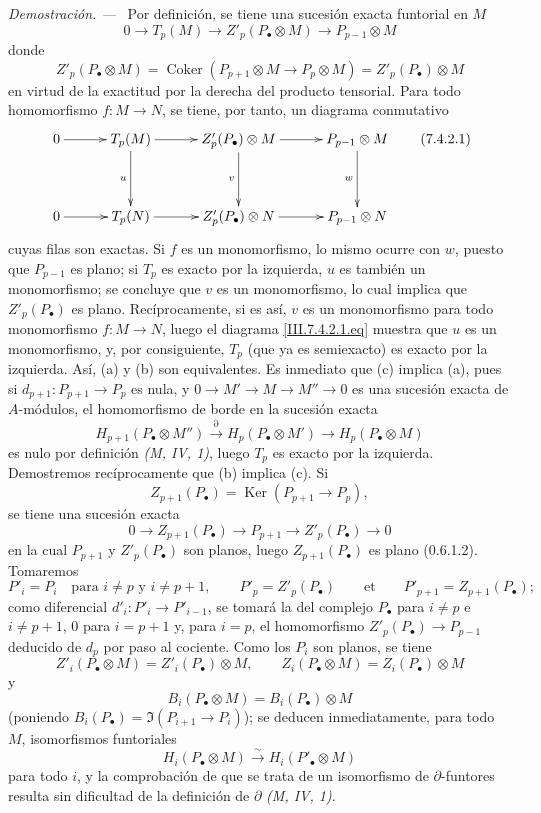 \documentclass[10pt,oneside]{book}
\newcommand{\Ker}{\operatorname{Ker}}
\newcommand{\Coker}{\operatorname{Coker}}
\newcommand{\sref}[2][]{\textup{(#2)}}
\newcommand{\oldpage}[2][]{\setcounter{footnote}{0}\marginpar{\scriptsize\textbf{#1}~|~#2}\ignorespaces}
\newenvironment{proof}{\par\medskip\noindent\textit{Demostración. ---\ }}{\par}
\begin{document}
\begin{proof}
Por definición, se tiene una sucesión exacta funtorial en $M$
\[
  0\longrightarrow T_p(M)
  \longrightarrow Z'_p(P_\bullet\otimes M)
  \longrightarrow P_{p-1}\otimes M
\]
donde
\[
  Z'_p(P_\bullet\otimes M)
  =
  \Coker(P_{p+1}\otimes M\longrightarrow P_p\otimes M)
  =
  Z'_p(P_\bullet)\otimes M
\]
en virtud de la exactitud por la derecha del producto tensorial. Para todo
homomorfismo $f:M\to N$, se tiene, por tanto, un diagrama conmutativo
\[
\xymatrix@C=30pt@R=38pt{
  0\ar[r]
  &T_p(M)\ar[r]\ar[d]_u
  &Z'_p(P_\bullet)\otimes M\ar[r]\ar[d]_v
  &P_{p-1}\otimes M\ar[d]_w
  \\
  0\ar[r]
  &T_p(N)\ar[r]
  &Z'_p(P_\bullet)\otimes N\ar[r]
  &P_{p-1}\otimes N
}
\tag{7.4.2.1}\label{III.7.4.2.1.eq}
\]
cuyas filas son exactas. Si $f$ es un monomorfismo, lo mismo ocurre con $w$,
puesto que $P_{p-1}$ es plano; si $T_p$ es exacto por la izquierda, $u$ es
también un monomorfismo; se concluye que $v$ es un monomorfismo, lo cual
implica que $Z'_p(P_\bullet)$ es plano. Recíprocamente, si es así, $v$ es un
monomorfismo para todo monomorfismo $f:M\to N$, luego el diagrama
\eqref{III.7.4.2.1.eq} muestra que $u$ es un monomorfismo, y, por consiguiente,
$T_p$ (que ya es semiexacto) es exacto por la izquierda. Así, (a) y (b) son
equivalentes. Es inmediato que (c) implica (a), pues si
$d_{p+1}:P_{p+1}\to P_p$ es nula, y
$0\to M'\to M\to M''\to0$ es una sucesión exacta de $A$-módulos, el
homomorfismo de borde en la sucesión exacta
\[
  H_{p+1}(P_\bullet\otimes M'')
  \xrightarrow{\partial}H_p(P_\bullet\otimes M')
  \longrightarrow H_p(P_\bullet\otimes M)
\]
\oldpage[III]{187}
es nulo por definición \emph{(M, IV, 1)}, luego $T_p$ es exacto por la
izquierda. Demostremos recíprocamente que (b) implica (c). Si
\[
  Z_{p+1}(P_\bullet)=\Ker(P_{p+1}\longrightarrow P_p),
\]
se tiene una sucesión exacta
\[
  0\longrightarrow Z_{p+1}(P_\bullet)\longrightarrow P_{p+1}
  \longrightarrow Z'_p(P_\bullet)\longrightarrow0
\]
en la cual $P_{p+1}$ y $Z'_p(P_\bullet)$ son planos, luego
$Z_{p+1}(P_\bullet)$ es plano \sref[0]{0.6.1.2}. Tomaremos
\[
  P'_i=P_i\quad\text{para }i\ne p\text{ y }i\ne p+1,
  \qquad
  P'_p=Z'_p(P_\bullet)
  \qquad\text{et}\qquad
  P'_{p+1}=Z_{p+1}(P_\bullet);
\]
como diferencial $d'_i:P'_i\to P'_{i-1}$, se tomará la del complejo
$P_\bullet$ para $i\ne p$ e $i\ne p+1$, $0$ para $i=p+1$ y, para $i=p$,
el homomorfismo $Z'_p(P_\bullet)\to P_{p-1}$ deducido de $d_p$ por paso al
cociente. Como los $P_i$ son planos, se tiene
\[
  Z'_i(P_\bullet\otimes M)=Z'_i(P_\bullet)\otimes M,
  \qquad
  Z_i(P_\bullet\otimes M)=Z_i(P_\bullet)\otimes M
\]
y
\[
  B_i(P_\bullet\otimes M)=B_i(P_\bullet)\otimes M
\]
(poniendo $B_i(P_\bullet)=\Im(P_{i+1}\to P_i)$); se deducen inmediatamente,
para todo $M$, isomorfismos funtoriales
\[
  H_i(P_\bullet\otimes M)\xrightarrow{\sim}H_i(P'_\bullet\otimes M)
\]
para todo $i$, y la comprobación de que se trata de un isomorfismo de
$\partial$-funtores resulta sin dificultad de la definición de $\partial$
\emph{(M, IV, 1)}.
\end{proof}
\end{document}
